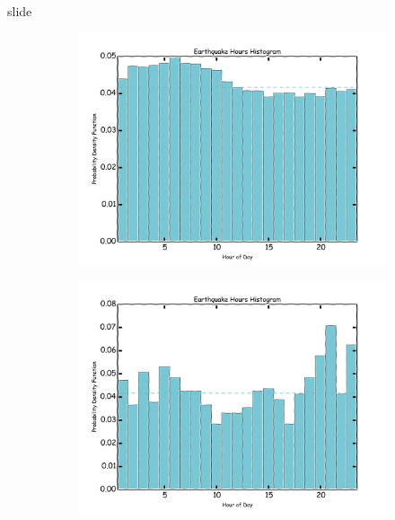 \documentclass[ucs,8pt]{beamer}
\begin{document}
\begin{frame}{slide}
\begin{figure}[H]
 	\begin{subfigure}[b]{0.45\textheight}
		  	\centering
			\includegraphics[height=1.00\textheight]{hmtk_sa3_hour}
			\label{fig:sa_hour_hist}
	\end{subfigure}%
	\quad %
	\begin{subfigure}[b]{0.45\textheight}
		  	\centering
			\includegraphics[height=1.00\textheight]{hmtk_bsb2013_hour}
			\label{fig:br_hour_hist}
    \end{subfigure}%


\end{figure}
\end{frame}
\end{document}
